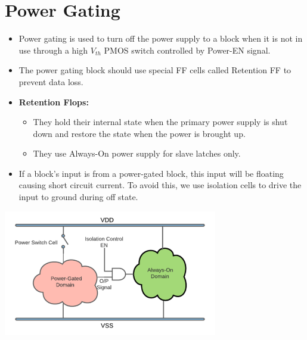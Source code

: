 \documentclass[11pt]{article}
\begin{document}
\section*{Power Gating}
\begin{itemize}
    \item Power gating is used to turn off the power supply to a block when it is not in use through a high $V_{th}$ PMOS switch controlled by Power-EN signal.
    \item The power gating block should use special FF cells called Retention FF to prevent data loss.
    \item \textbf{Retention Flops:} 
        \begin{itemize}
            \item They hold their internal state when the primary power supply is shut down and restore the state when the power is brought up. 
            \item They use Always-On power supply for slave latches only.
        \end{itemize}
    \item If a block's input is from a power-gated block, this input will be floating causing short circuit current. To avoid this, we use isolation cells to drive the input to ground during off state.
\end{itemize}
\begin{center}
    \includegraphics[width=0.7\textwidth]{4.png}
\end{center}
\end{document}
